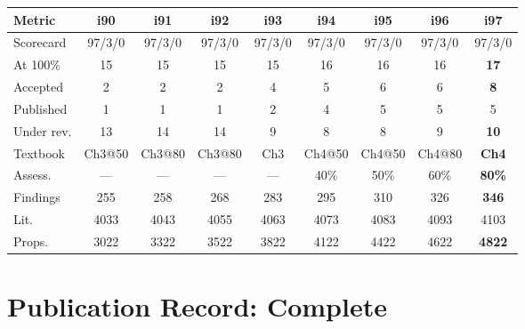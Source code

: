\documentclass[11pt,a4paper]{article}
\begin{document}
\begin{center}
\begin{tabular}{lcccccccc}
\toprule
\textbf{Metric} & \textbf{i90} & \textbf{i91} & \textbf{i92} & \textbf{i93} & \textbf{i94} & \textbf{i95} & \textbf{i96} & \textbf{i97} \\
\midrule
Scorecard & 97/3/0 & 97/3/0 & 97/3/0 & 97/3/0 & 97/3/0 & 97/3/0 & 97/3/0 & 97/3/0 \\
At 100\% & 15 & 15 & 15 & 15 & 16 & 16 & 16 & \textbf{17} \\
Accepted & 2 & 2 & 2 & 4 & 5 & 6 & 6 & \textbf{8} \\
Published & 1 & 1 & 1 & 2 & 4 & 5 & 5 & 5 \\
Under rev. & 13 & 14 & 14 & 9 & 8 & 8 & 9 & \textbf{10} \\
Textbook & Ch3@50 & Ch3@80 & Ch3@80 & Ch3 & Ch4@50 & Ch4@50 & Ch4@80 & \textbf{Ch4} \\
Assess. & --- & --- & --- & --- & 40\% & 50\% & 60\% & \textbf{80\%} \\
Findings & 255 & 258 & 268 & 283 & 295 & 310 & 326 & \textbf{346} \\
Lit. & 4033 & 4043 & 4055 & 4063 & 4073 & 4083 & 4093 & 4103 \\
Props. & 3022 & 3322 & 3522 & 3822 & 4122 & 4422 & 4622 & \textbf{4822} \\
\bottomrule
\end{tabular}
\end{center}

\section{Publication Record: Complete}
\end{document}
